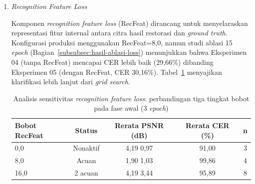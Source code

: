 \begin{enumerate}[leftmargin=1.5em, labelsep=0.5em, itemindent=0pt, label=\arabic*., topsep=0pt, partopsep=0pt]
\begin{enumerate}[leftmargin=1.5em, labelsep=0.5em, itemindent=0pt, topsep=0.5em, label=\alph*.]
        Hasil analisis menunjukkan bahwa variasi bobot CTC dalam rentang $\pm$50\% dari nilai acuan (0,15) tidak menghasilkan perbedaan PSNR yang signifikan (rentang 3,16--4,20 dB). Ketiga konfigurasi menghasilkan CER yang sebanding ($\sim$96\%), mengindikasikan bahwa sinyal CTC sudah memadai pada bobot 0,075 dan penggandaan hingga 0,30 tidak memberikan keuntungan tambahan. Temuan ini menjawab pertanyaan penelitian: pada rentang yang diuji, bobot CTC tidak menyebabkan degradasi kualitas visual yang berarti. Konfigurasi produksi menggunakan bobot 0,15 sebagai titik tengah yang seimbang.

        \item \textit{Recognition Feature Loss}
        
        Komponen \textit{recognition feature loss} (RecFeat) dirancang untuk menyelaraskan representasi fitur internal antara citra hasil restorasi dan \textit{ground truth}. Konfigurasi produksi menggunakan RecFeat=8,0, namun studi ablasi 15 \textit{epoch} (Bagian~\ref{subsubsec:hasil-ablasi-loss}) menunjukkan bahwa Eksperimen 04 (tanpa RecFeat) mencapai CER lebih baik (29,66\%) dibanding Eksperimen 05 (dengan RecFeat, CER 30,16\%). Tabel~\ref{tab:recfeat-sensitivity} menyajikan klarifikasi lebih lanjut dari \textit{grid search}.

        \begin{table}[!htbp]
            \caption[Sensitivitas bobot RecFeat]{Analisis sensitivitas \textit{recognition feature loss}: perbandingan tiga tingkat bobot pada fase awal (3 \textit{epoch})}
            \label{tab:recfeat-sensitivity}
            \normalsize
            \begin{tabular}{lcccc}
                \hline
                \textbf{Bobot RecFeat} & \textbf{Status}      & \textbf{Rerata PSNR (dB)} & \textbf{Rerata CER (\%)} & \textbf{n} \\
                \hline
                0,0            & Nonaktif    & 4,19 \textpm{} 0,97   & 91,00        & 3 \\
                8,0            & Acuan    & 1,90 \textpm{} 1,03   & 99,86        & 4 \\
                16,0           & 2\texttimes{} acuan & 4,19 \textpm{} 3,44   & 95,89        & 8 \\
                \hline
            \end{tabular}
        \end{table}


\end{enumerate}
\end{enumerate}
